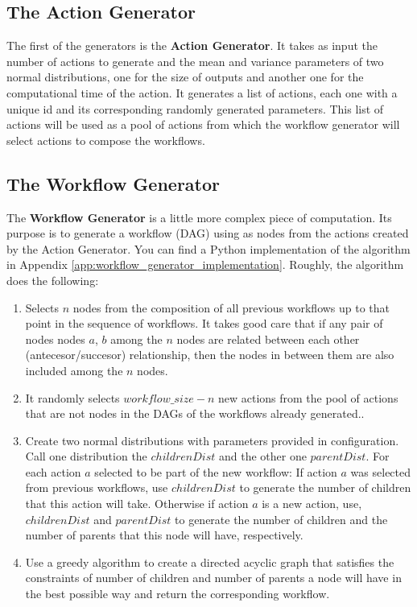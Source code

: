 \subsection{The Action Generator}
The first of the generators is the \textbf{Action Generator}.  It takes as input the number of actions to generate and the mean and variance parameters of two normal distributions, one for the size of outputs and another one for the computational time of the action.  It generates a list of actions, each one with a unique id and its corresponding randomly generated parameters. This list of actions will be used as a pool of actions from which the workflow generator will select actions to compose the workflows.

\subsection{The Workflow Generator}
The \textbf{Workflow Generator} is a little more complex piece of computation.  Its purpose is to generate a workflow (DAG) using as nodes from the actions created by the Action Generator.  You can find a Python implementation of the algorithm in Appendix \ref{app:workflow_generator_implementation}.  Roughly, the algorithm does the following:
\begin{enumerate}
\item Selects $n$ nodes from the composition of all previous workflows up to that point in the sequence of workflows. It takes good care that if any pair of nodes nodes $a$, $b$ among the $n$ nodes are related between each other (antecesor/succesor) relationship, then the nodes in between them are also included among the $n$ nodes.

\item It randomly selects $workflow\_size - n$ new actions from the pool of actions that are not nodes in the DAGs of the workflows already generated..

\item Create two normal distributions with parameters provided in configuration.  Call one distribution the $childrenDist$ and the other one $parentDist$. For each action $a$ selected to be part of the new workflow: If action $a$ was selected from previous workflows, use $childrenDist$ to generate the number of children that this action will take.  Otherwise if action $a$ is a new action, use, $childrenDist$ and $parentDist$ to generate the number of children and the number of parents that this node will have, respectively.

\item Use a greedy algorithm to create a directed acyclic graph that satisfies the constraints of number of children and number of parents a node will have in the best possible way and return the corresponding workflow.
\end{enumerate}

